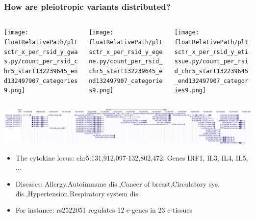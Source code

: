 \documentclass{beamer}
\newcommand*{\floatRelativePath}{../out/gwas417/pval_5e-08/r2_0.1/kb_1000/window_1000000/75_50}%
\begin{document}
\begin{frame}
    \frametitle{How are pleiotropic variants distributed?}

    \begin{columns}
        \begin{column}{0.32\textwidth}
            \begin{center}
                \texttt{[image: \\floatRelativePath/pltsctr\_x\_per\_rsid\_y\_gwas.py/count\_per\_rsid\_chr5\_start132239645\_end132497907\_categories9.png]}
            \end{center}
        \end{column}
        \begin{column}{0.32\textwidth}
            \begin{center}
                \texttt{[image: \\floatRelativePath/pltsctr\_x\_per\_rsid\_y\_egene.py/count\_per\_rsid\_chr5\_start132239645\_end132497907\_categories9.png]}
            \end{center}
        \end{column}
        \begin{column}{0.32\textwidth}
            \begin{center}
                \texttt{[image: \\floatRelativePath/pltsctr\_x\_per\_rsid\_y\_etissue.py/count\_per\_rsid\_chr5\_start132239645\_end132497907\_categories9.png]}
            \end{center}
        \end{column}
    \end{columns}

    \begin{center}
        \includegraphics[width=\textwidth]{../presentation_230120_gold2022_paris/fig/chr5_131912097_132802472.png}
    \end{center}

    \small
    \begin{itemize}
        \item The cytokine locus: chr5:131,912,097-132,802,472. Genes IRF1, IL3, IL4, IL5, ...
        \item Diseases: Allergy,Autoimmune dis.,Cancer of breast,Circulatory sys. dis.,Hypertension,Respiratory system dis.
        \item For instance: rs2522051 regulates 12 e-genes in 23 e-tissues
    \end{itemize}
    \normalsize

\end{frame}
\end{document}
